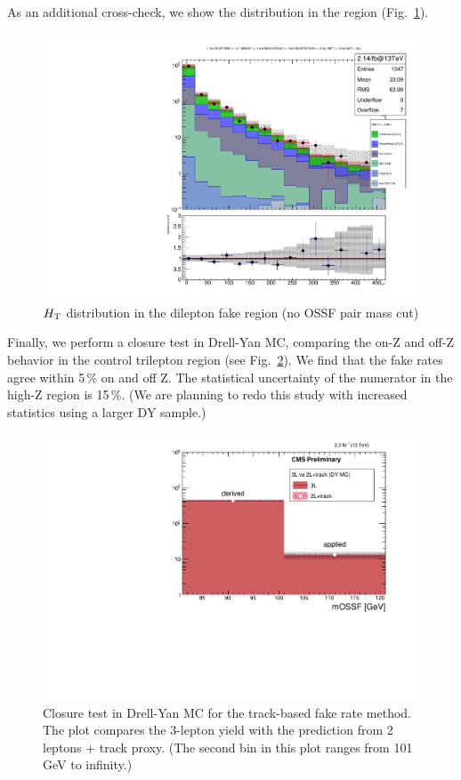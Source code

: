 As an additional cross-check, we show the \HT distribution in the \Z region (Fig.~\ref{fig:fakeLight_Z_HT}).
\begin{figure}
\begin{center}
	\includegraphics[width=.7\textwidth]{Background/bkg_fakeLight/Z_HT}
	\caption{$H_{\mathrm{T}}$ distribution in the dilepton fake region (no OSSF pair mass cut)
	\label{fig:fakeLight_Z_HT}}
\end{center}
\end{figure}
Finally, we perform a closure test in Drell-Yan MC, comparing the on-Z and off-Z behavior in the control trilepton region (see Fig.~\ref{fig:fakeLight_closure}). We find that the fake rates agree within 5\,\% on and off Z. The statistical uncertainty of the numerator in the high-Z region is 15\,\%. (We are planning to redo this study with increased statistics using a larger DY sample.)

\begin{figure}
\begin{center}
	\includegraphics[width=.7\textwidth]{Background/bkg_fakeLight/L3vsL2T1_MOSSF-formatted}
	\caption{Closure test in Drell-Yan MC for the track-based fake rate method. The plot compares the 3-lepton yield with the prediction from 2 leptons + track proxy. (The second bin in this plot ranges from 101 GeV to infinity.)
	\label{fig:fakeLight_closure}}
\end{center}
\end{figure}
